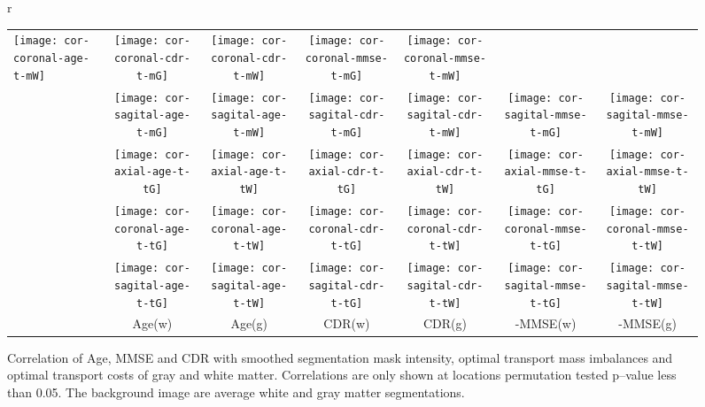 \begin{figure}[h!]
\begin{tabular}{r}
\begin{tabular}{l|cc|cc|cc}
\texttt{[image: cor-coronal-age-t-mW]} &
\texttt{[image: cor-coronal-cdr-t-mG]} &
\texttt{[image: cor-coronal-cdr-t-mW]} &
\texttt{[image: cor-coronal-mmse-t-mG]} &
\texttt{[image: cor-coronal-mmse-t-mW]} \\ 
%
        &
\texttt{[image: cor-sagital-age-t-mG]} &
\texttt{[image: cor-sagital-age-t-mW]} &
\texttt{[image: cor-sagital-cdr-t-mG]} &
\texttt{[image: cor-sagital-cdr-t-mW]} &
\texttt{[image: cor-sagital-mmse-t-mG]} &
\texttt{[image: cor-sagital-mmse-t-mW]} \\ \hline \hline
\parbox[t]{2mm}{}&
\texttt{[image: cor-axial-age-t-tG]} &
\texttt{[image: cor-axial-age-t-tW]} &
\texttt{[image: cor-axial-cdr-t-tG]} &
\texttt{[image: cor-axial-cdr-t-tW]} &
\texttt{[image: cor-axial-mmse-t-tG]} &
\texttt{[image: cor-axial-mmse-t-tW]} \\ 
%
        &
\texttt{[image: cor-coronal-age-t-tG]} &
\texttt{[image: cor-coronal-age-t-tW]} &
\texttt{[image: cor-coronal-cdr-t-tG]} &
\texttt{[image: cor-coronal-cdr-t-tW]} &
\texttt{[image: cor-coronal-mmse-t-tG]} &
\texttt{[image: cor-coronal-mmse-t-tW]} \\ 
%
        &
\texttt{[image: cor-sagital-age-t-tG]} &
\texttt{[image: cor-sagital-age-t-tW]} &
\texttt{[image: cor-sagital-cdr-t-tG]} &
\texttt{[image: cor-sagital-cdr-t-tW]} &
\texttt{[image: cor-sagital-mmse-t-tG]} &
\texttt{[image: cor-sagital-mmse-t-tW]} \\ \hline \hline
%
& \parbox[b][4mm]{12mm}{Age(w)} 
& \parbox[b][4mm]{12mm}{Age(g)} 
& \parbox[b][4mm]{15mm}{CDR(w)} 
& \parbox[b][4mm]{15mm}{CDR(g) }
& \parbox[b][4mm]{15mm}{-MMSE(w)}
& \parbox[b][4mm]{15mm}{-MMSE(g)}
\end{tabular}
\end{tabular}
\caption{\label{fig:cor-oasis}
Correlation of Age, MMSE and CDR with smoothed segmentation mask intensity,
optimal transport mass imbalances and optimal transport costs of gray and white
matter.  Correlations are only shown at locations permutation tested p--value
less than 0.05. The background image are average white and gray matter
segmentations. 
} 
\end{figure} \endgroup






